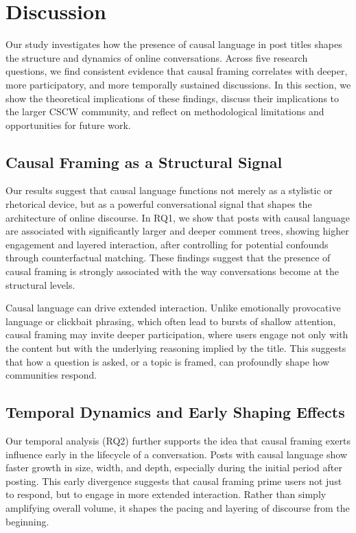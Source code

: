 \documentclass[acmsmall]{acmart}
\begin{document}
\section{Discussion}

Our study investigates how the presence of causal language in post titles shapes the structure and dynamics of online conversations. Across five research questions, we find consistent evidence that causal framing correlates with deeper, more participatory, and more temporally sustained discussions. In this section, we show the theoretical implications of these findings, discuss their implications to the larger CSCW community, and reflect on methodological limitations and opportunities for future work.

\subsection{Causal Framing as a Structural Signal}

Our results suggest that causal language functions not merely as a stylistic or rhetorical device, but as a powerful conversational signal that shapes the architecture of online discourse. In RQ1, we show that posts with causal language are associated with significantly larger and deeper comment trees, showing higher engagement and layered interaction, after controlling for potential confounds through counterfactual matching. These findings suggest that the presence of causal framing is strongly associated with the way conversations become at the structural levels.

Causal language can drive extended interaction. Unlike emotionally provocative language or clickbait phrasing, which often lead to bursts of shallow attention, causal framing may invite deeper participation, where users engage not only with the content but with the underlying reasoning implied by the title. This  suggests that how a question is asked, or a topic is framed, can profoundly shape how communities respond.



\subsection{Temporal Dynamics and Early Shaping Effects}

Our temporal analysis (RQ2) further supports the idea that causal framing exerts influence early in the lifecycle of a conversation. Posts with causal language show faster growth in size, width, and depth, especially during the initial period after posting. This early divergence suggests that causal framing prime users not just to respond, but to engage in more extended interaction. Rather than simply amplifying overall volume, it shapes the pacing and layering of discourse from the beginning.
\end{document}
